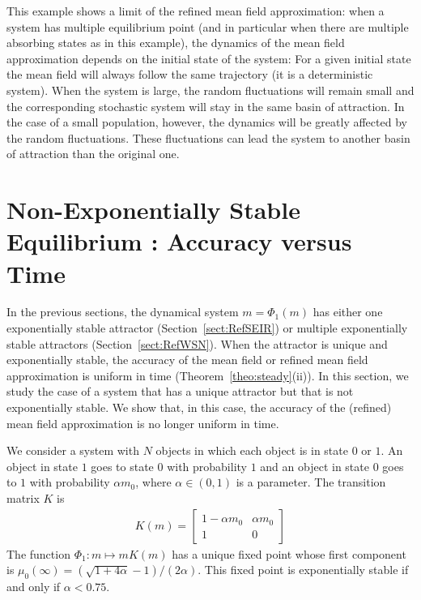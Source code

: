 \documentclass{amsart}
\begin{document}
This example shows a limit of the refined mean field approximation:
when a system has multiple equilibrium point (and in particular when
there are multiple absorbing states as in this example), the dynamics
of the mean field approximation depends on the initial state of the
system: For a given initial state the mean field will always follow
the same trajectory (it is a deterministic system). When the system is
large, the random fluctuations will remain small and the corresponding
stochastic system will stay in the same basin of attraction.  In the
case of a small population, however, the dynamics will be greatly
affected by the random fluctuations. These fluctuations can lead the
system to another basin of attraction than the original one.


\section{Non-Exponentially Stable Equilibrium : Accuracy versus Time}
\label{sect:non-exponentially-stable}

In the previous sections, the dynamical system $m=\Phi_1(m)$ has
either one exponentially stable attractor (Section~\ref{sect:RefSEIR})
or multiple exponentially stable attractors
(Section~\ref{sect:RefWSN}).  When the attractor is unique and
exponentially stable, the accuracy of the mean field or refined mean
field approximation is uniform in time
(Theorem~\ref{theo:steady}(ii)).  In this section, we study the case
of a system that has a unique attractor but that is not exponentially
stable.  We show that, in this case, the accuracy of the (refined)
mean field approximation is no longer uniform in time.


We consider a system with $N$ objects in which each object is in state
$0$ or $1$. An object in state $1$ goes to state $0$ with probability
$1$ and an object in state $0$ goes to $1$ with probability
$\alpha m_0$, where $\alpha\in(0,1)$ is a parameter. The transition
matrix $K$ is
\begin{align*}
  K(m) = \left[
  \begin{array}{cc}
    1-\alpha m_0&\alpha m_0\\
    1 & 0
  \end{array}
\right]
\end{align*}
The function $\Phi_1:m\mapsto mK(m)$ has a unique fixed point whose
first component is
$\mu_0(\infty)=(\sqrt{1+4\alpha}-1)/(2\alpha)$. This fixed point is
exponentially stable if and only if $\alpha < 0.75$.
\end{document}
